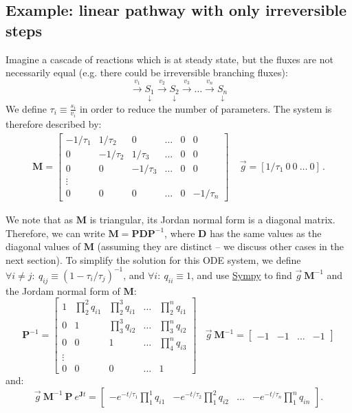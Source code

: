 \documentclass{article}
\begin{document}
\subsection{Example: linear pathway with only irreversible steps}
Imagine a cascade of reactions which is at steady state, but the fluxes are not necessarily equal (e.g. there could be irreversible branching fluxes):
\begin{equation}
    \xrightarrow{v_1} \underset{\downarrow}{S_1} 
    \xrightarrow{v_2} \underset{\downarrow}{S_2}
    \xrightarrow{v_3} \ldots 
    \xrightarrow{v_n} \underset{\downarrow}{S_n}
\end{equation}
We define $\tau_i \equiv \frac{s_i}{v_i}$ in order to reduce the number of parameters. The system is therefore described by:
\begin{eqnarray}
\mathbf{M} =
  \begin{bmatrix}
    -1/\tau_1 & 1/\tau_2 & 0 & \ldots & 0 & 0\\
    0 & -1/\tau_2 & 1/\tau_3 & \ldots & 0 & 0\\
    0 & 0 & -1/\tau_3 & \ldots & 0 & 0\\
    \vdots\\
    0 & 0 & 0 & \ldots & 0 & -1/\tau_n
  \end{bmatrix}
~~~~~
\vec{g} = \left[1/\tau_1~0~0~\ldots~0\right]\,.
\end{eqnarray}

We note that as $\mathbf{M}$ is triangular, its Jordan normal form is a diagonal matrix. Therefore, we can write $\mathbf{M} = \mathbf{P} \mathbf{D} \mathbf{P}^{-1}$, where $\mathbf{D}$ has the same values as the diagonal values of $\mathbf{M}$ (assuming they are distinct -- we discuss other cases in the next section). To simplify the solution for this ODE system, we define $\forall i \neq j:~q_{ij} \equiv (1 - \tau_i/\tau_j)^{-1}$, and $\forall i:~q_{ii} \equiv 1$, and use \href{https://www.sympy.org/}{Sympy} to find $\vec{g}~\mathbf{M}^{-1}$ and the Jordam normal form of $\mathbf{M}$:
\[
\mathbf{P}^{-1} =
\begin{bmatrix}
1 & \prod_{2}^2 q_{i1} & \prod_{2}^3 q_{i1} & \ldots & \prod_{2}^n q_{i1} \\
0 & 1 & \prod_{3}^3 q_{i2} & \ldots & \prod_{3}^n q_{i2} \\
0 & 0 & 1 & \ldots & \prod_{4}^n q_{i3} \\
\vdots\\
0 & 0 & 0 & \ldots & 1
\end{bmatrix}
~~~~
\vec{g}~\mathbf{M}^{-1} = \begin{bmatrix} -1 & -1 & \ldots & -1 \end{bmatrix}
\]
and:
\[
    \vec{g}~\mathbf{M}^{-1}~\mathbf{P}~e^{\mathbf{J} t}
    =
    \begin{bmatrix}
        -e^{-t/\tau_1} \prod_{1}^1 q_{i1} & -e^{-t/\tau_2} \prod_{1}^2 q_{i2} & \ldots & -e^{-t/\tau_n} \prod_{1}^n q_{in}
    \end{bmatrix}.
\]
\end{document}
